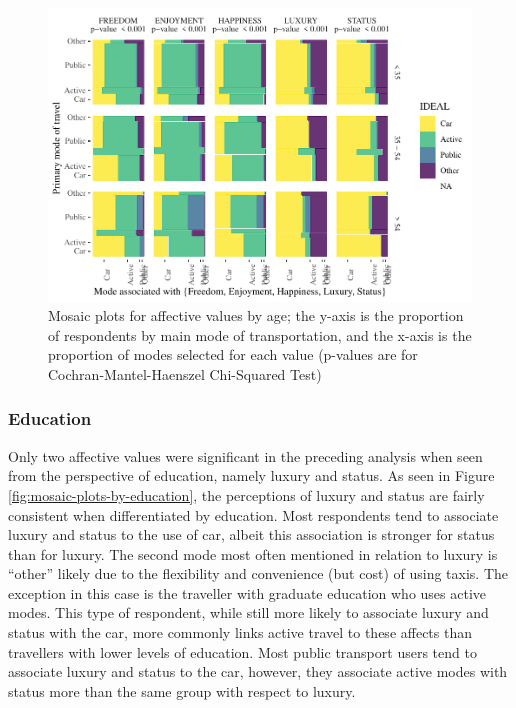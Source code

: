 \documentclass[]{elsarticle} %
\makeatletter
\def\maxwidth{\ifdim\Gin@nat@width>\linewidth\linewidth
\else\Gin@nat@width\fi}
\let\Oldincludegraphics\includegraphics
\renewcommand{\includegraphics}[1]{\Oldincludegraphics[width=\maxwidth]{#1}}
\makeatother
\begin{document}
\begin{figure}
\centering
\includegraphics{Dissonance_Santiago_v1_files/figure-latex/figure-mosaic-plots-by-attribute-and-age-1.pdf}
\caption{\label{fig:mosaic-plots-by-age}Mosaic plots for affective
values by age; the y-axis is the proportion of respondents by main mode
of transportation, and the x-axis is the proportion of modes selected
for each value (p-values are for Cochran-Mantel-Haenszel Chi-Squared
Test)}
\end{figure}

\hypertarget{education-1}{%
\subsubsection{Education}\label{education-1}}

Only two affective values were significant in the preceding analysis
when seen from the perspective of education, namely luxury and status.
As seen in Figure \ref{fig:mosaic-plots-by-education}, the perceptions
of luxury and status are fairly consistent when differentiated by
education. Most respondents tend to associate luxury and status to the
use of car, albeit this association is stronger for status than for
luxury. The second mode most often mentioned in relation to luxury is
``other'' likely due to the flexibility and convenience (but cost) of
using taxis. The exception in this case is the traveller with graduate
education who uses active modes. This type of respondent, while still
more likely to associate luxury and status with the car, more commonly
links active travel to these affects than travellers with lower levels
of education. Most public transport users tend to associate luxury and
status to the car, however, they associate active modes with status more
than the same group with respect to luxury.
\end{document}
